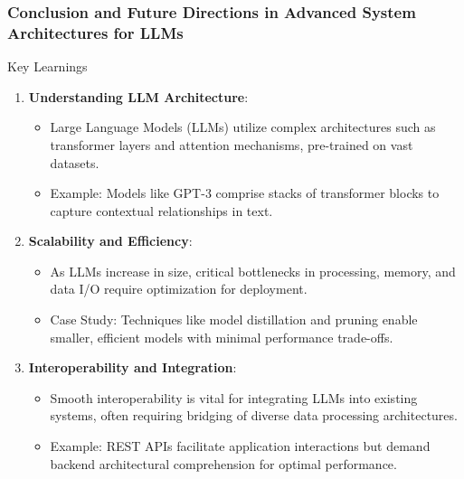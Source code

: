 \documentclass[aspectratio=169]{beamer}
\begin{document}
\begin{frame}[fragile]
    \frametitle{Conclusion and Future Directions in Advanced System Architectures for LLMs}
    
    \begin{block}{Key Learnings}
        \begin{enumerate}
            \item \textbf{Understanding LLM Architecture}:
            \begin{itemize}
                \item Large Language Models (LLMs) utilize complex architectures such as transformer layers and attention mechanisms, pre-trained on vast datasets.
                \item Example: Models like GPT-3 comprise stacks of transformer blocks to capture contextual relationships in text.
            \end{itemize}

            \item \textbf{Scalability and Efficiency}:
            \begin{itemize}
                \item As LLMs increase in size, critical bottlenecks in processing, memory, and data I/O require optimization for deployment.
                \item Case Study: Techniques like model distillation and pruning enable smaller, efficient models with minimal performance trade-offs.
            \end{itemize}

            \item \textbf{Interoperability and Integration}:
            \begin{itemize}
                \item Smooth interoperability is vital for integrating LLMs into existing systems, often requiring bridging of diverse data processing architectures.
                \item Example: REST APIs facilitate application interactions but demand backend architectural comprehension for optimal performance.
            \end{itemize}
        \end{enumerate}
    \end{block}
\end{frame}
\end{document}
